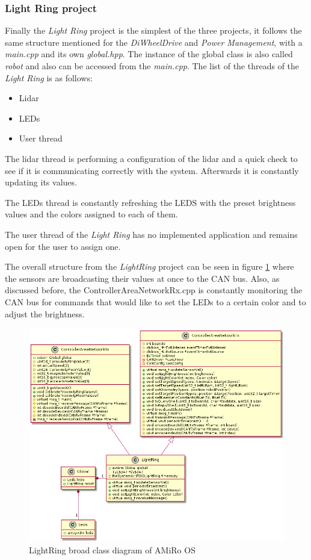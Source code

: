 \documentclass[12pt]{report}%
\begin{document}
\subsubsection{Light Ring project}
Finally the \textit{Light Ring} project is the simplest of the three projects, it follows the same structure mentioned for the \textit{DiWheelDrive} and \textit{Power Management}, with a \textit{main.cpp} and its own \textit{global.hpp}. The instance of the global class is also called \textit{robot} and also can be accessed from the \textit{main.cpp}. The list of the threads of the \textit{Light Ring} is as follows:

\begin{itemize}
	\item Lidar
	\item LEDs
	\item User thread
\end{itemize}

The lidar thread is performing a configuration of the lidar and a quick check to see if it is communicating correctly with the system. Afterwards it is constantly updating its values.

The LEDs thread is constantly refreshing the LEDS with the preset brightness values and the colors assigned to each of them.

The user thread of the \textit{Light Ring} has no implemented application and remains open for the user to assign one.

The overall structure from the \textit{LightRing} project can be seen in figure \ref{fig:LRclassOS} where the sensors are broadcasting their values at once to the CAN bus. Also, as discussed before, the ControllerAreaNetworkRx.cpp is constantly monitoring the CAN bus for commands that would like to set the LEDs to a certain color and to adjust the brightness.

\begin{figure}[ht]
	\centering
	\includegraphics[width=\textwidth]{LRclass_OS}
    \caption{LightRing broad class diagram of AMiRo OS}
    \label{fig:LRclassOS}
\end{figure}
\end{document}
